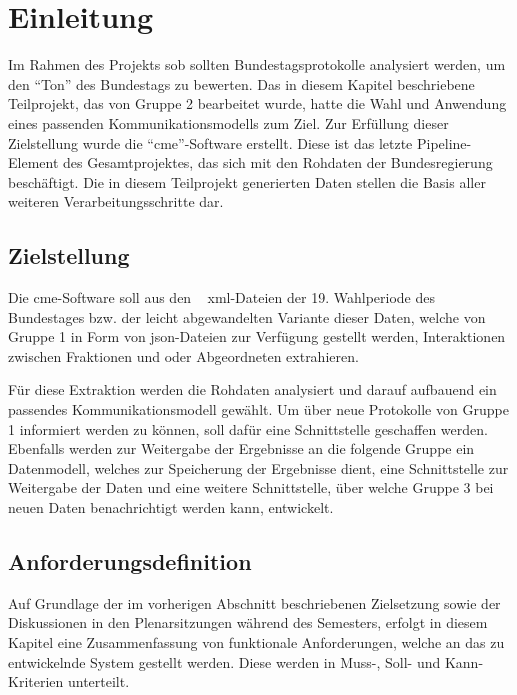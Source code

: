 \section{Einleitung}
\label{sec:03_01_einleitung}

Im Rahmen des Projekts \gls{sob} sollten Bundestagsprotokolle analysiert
werden, um den \enquote{Ton} des Bundestags zu bewerten. Das in diesem
Kapitel beschriebene Teilprojekt, das von Gruppe 2 bearbeitet wurde, hatte
die Wahl und Anwendung eines passenden Kommunikationsmodells zum Ziel. Zur
Erfüllung dieser Zielstellung wurde die \enquote{\gls{cme}}-Software erstellt.
Diese ist das letzte Pipeline-Element des Gesamtprojektes, das sich mit den Rohdaten der
Bundesregierung beschäftigt. Die in diesem Teilprojekt generierten Daten
stellen die Basis aller weiteren Verarbeitungsschritte dar.

\subsection{Zielstellung}
Die \gls{cme}-Software soll aus den ~\cite{OpenData2019}
\gls{xml}-Dateien der 19. Wahlperiode des Bundestages bzw. der leicht
abgewandelten Variante dieser Daten, welche von Gruppe 1 in Form von
\gls{json}-Dateien zur Verfügung gestellt werden, Interaktionen zwischen
Fraktionen und oder Abgeordneten extrahieren.

Für diese Extraktion werden die Rohdaten analysiert und darauf aufbauend ein
passendes Kommunikationsmodell gewählt. Um über neue Protokolle von Gruppe 1
informiert werden zu können, soll dafür eine Schnittstelle geschaffen werden.
Ebenfalls werden zur Weitergabe der Ergebnisse an die folgende Gruppe ein
Datenmodell, welches zur Speicherung der Ergebnisse dient, eine Schnittstelle
zur Weitergabe der Daten und eine weitere Schnittstelle, über welche Gruppe 3
bei neuen Daten benachrichtigt werden kann, entwickelt.

\subsection{Anforderungsdefinition}

Auf Grundlage der im vorherigen Abschnitt beschriebenen Zielsetzung sowie der
Diskussionen in den Plenarsitzungen während des Semesters, erfolgt in diesem
Kapitel eine Zusammenfassung von funktionale Anforderungen, welche an das zu
entwickelnde System gestellt werden. Diese werden in Muss-, Soll- und
Kann-Kriterien unterteilt.


